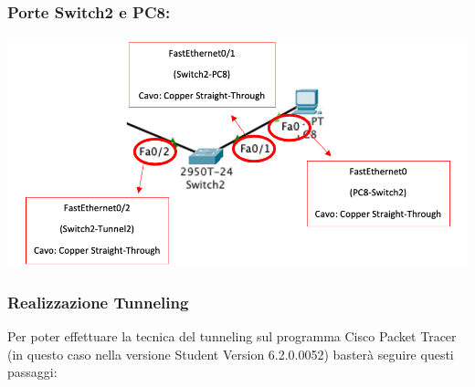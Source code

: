 \subsubsection*{Porte Switch2 e PC8:}

\begin{center}
    \includegraphics[width=\linewidth]{images/07.routing-sicurezza/tunneling/09.png}
\end{center}

\subsubsection{Realizzazione Tunneling}
Per poter effettuare la tecnica del tunneling sul programma Cisco Packet Tracer (in questo caso nella versione Student Version 6.2.0.0052) basterà seguire questi passaggi:

